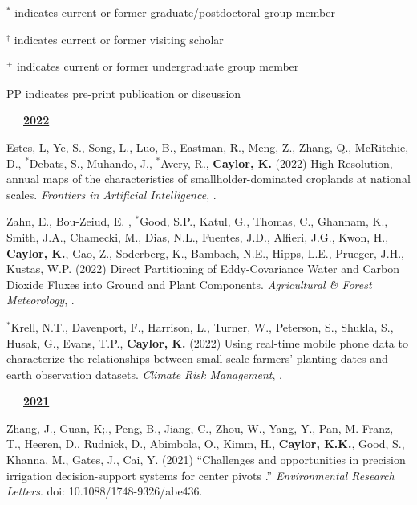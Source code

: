 \documentclass[10pt]{report}
\begin{document}
{ \small $^{*}$ indicates current or former graduate/postdoctoral group member}

{ \small $^{\dagger}$ indicates current or former visiting scholar}

{ \small $^{+}$ indicates current or former undergraduate group member}


{ PP indicates pre-print publication or discussion}

\vspace*{.1in}

\mbox{\ \ \ \underline{\textbf{2022}}}

\begin{etaremune}


\item Estes, L, Ye, S., Song, L., Luo, B., Eastman, R., Meng, Z., Zhang, Q., McRitchie, D., $^{*}$Debats, S., Muhando, J., $^{*}$Avery, R., \textbf{Caylor, K.} (2022) High Resolution, annual maps of the characteristics of smallholder-dominated croplands at national scales. \emph{Frontiers in Artificial Intelligence}, . 
\item Zahn, E., Bou-Zeiud, E. , $^{*}$Good, S.P., Katul, G., Thomas, C., Ghannam, K., Smith, J.A., Chamecki, M., Dias, N.L., Fuentes, J.D., Alfieri, J.G., Kwon, H., \textbf{Caylor, K.}, Gao, Z., Soderberg, K., Bambach, N.E., Hipps, L.E., Prueger, J.H., Kustas, W.P. (2022) Direct Partitioning of Eddy-Covariance Water and Carbon Dioxide Fluxes into Ground and Plant Components. \emph{Agricultural \& Forest Meteorology}, . 
\item $^{*}$Krell, N.T., Davenport, F., Harrison, L., Turner, W., Peterson, S., Shukla, S., Husak, G., Evans, T.P., \textbf{Caylor, K.} (2022) Using real-time mobile phone data to characterize the relationships between small-scale farmers' planting dates and earth observation datasets. \emph{Climate Risk Management}, . 


\mbox{\ \ \ \underline{\textbf{2021}}}


\item Zhang, J., Guan, K;., Peng, B., Jiang, C., Zhou, W., Yang, Y., Pan, M. Franz, T., Heeren, D., Rudnick, D., Abimbola, O., Kimm, H., \textbf{Caylor, K.K.}, Good, S., Khanna, M., Gates, J., Cai, Y. (2021) ``Challenges and opportunities in precision irrigation decision-support systems for center pivots .'' {\em Environmental Research Letters}. doi: 10.1088/1748-9326/abe436.


\end{etaremune}
\end{document}
